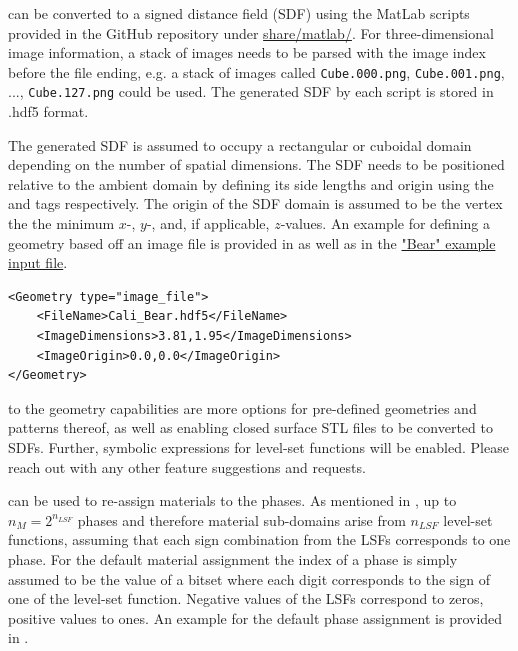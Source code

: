  can be converted to a signed distance field (SDF) using the MatLab scripts provided in the GitHub repository under \href{https://github.com/kkmaute/moris/tree/main/share/matlab}{share/matlab/}. For three-dimensional image information, a stack of images needs to be parsed with the image index before the file ending, e.g. a stack of images called \texttt{Cube.000.png}, \texttt{Cube.001.png}, ..., \texttt{Cube.127.png} could be used.
The generated SDF by each script is stored in .hdf5 format. 

The generated SDF is assumed to occupy a rectangular or cuboidal domain depending on the number of spatial dimensions. The SDF needs to be positioned relative to the ambient domain by defining its side lengths and origin using the  and  tags respectively. The origin of the SDF domain is assumed to be the vertex the the minimum $x$-, $y$-, and, if applicable, $z$-values. An example for defining a geometry based off an image file is provided in  as well as in the \href{https://github.com/kkmaute/moris/blob/main/share/doc/mesh_generation/examples/Bear_Example.xml}{"Bear" example input file}.

\begin{minipage}{\linewidth}
\vspace{0.5cm}
\begin{lstlisting}[caption={Example parameters for an image file as provided in one of the examples.},captionpos=b, label={lst:image}]
<Geometry type="image_file"> 
    <FileName>Cali_Bear.hdf5</FileName>
    <ImageDimensions>3.81,1.95</ImageDimensions>
    <ImageOrigin>0.0,0.0</ImageOrigin>
</Geometry>
\end{lstlisting}
\end{minipage}

 to the geometry capabilities are more options for pre-defined geometries and patterns thereof, as well as enabling closed surface STL files to be converted to SDFs. Further, symbolic expressions for level-set functions will be enabled. Please reach out with any other feature suggestions and requests.

 can be used to re-assign materials to the phases. As mentioned in , up to $n_M = 2^{n_{LSF}}$ phases and therefore material sub-domains arise from $n_{LSF}$ level-set functions, assuming that each sign combination from the LSFs corresponds to one phase. For the default material assignment the index of a phase is simply assumed to be the value of a bitset where each digit corresponds to the sign of one of the level-set function. Negative values of the LSFs correspond to zeros, positive values to ones. An example for the default phase assignment is provided in .


